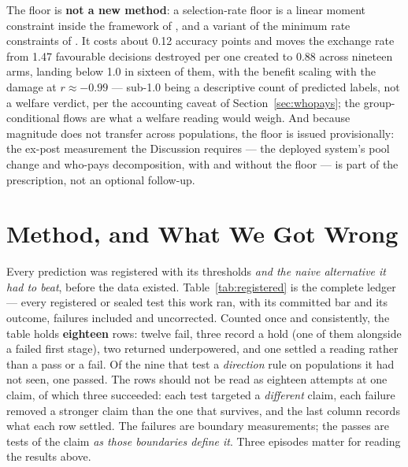 \documentclass[9pt,conference]{IEEEtran}
\begin{document}
The floor is \textbf{not a new method}: a selection-rate floor is a linear moment constraint
inside the framework of \cite{agarwal2018}, and a variant of the minimum rate constraints of
\cite{mittelstadt2023}. It costs about 0.12 accuracy points and moves the exchange rate from
1.47 favourable decisions destroyed per one created to 0.88 across nineteen arms, landing below
1.0 in sixteen of them, with the benefit scaling with the damage at $r \approx -0.99$ ---
sub-1.0 being a descriptive count of predicted labels, not a welfare verdict, per the
accounting caveat of Section~\ref{sec:whopays}; the group-conditional flows are what a
welfare reading would weigh. And because magnitude does not transfer across populations,
the floor is issued provisionally: the ex-post measurement the Discussion requires ---
the deployed system's pool change and who-pays decomposition, with and without the floor
--- is part of the prescription, not an optional follow-up.

\section{Method, and What We Got Wrong}
\label{sec:failures}

Every prediction was registered with its thresholds \emph{and the naive alternative it had to
beat}, before the data existed. Table~\ref{tab:registered} is the complete ledger --- every
registered or sealed test this work ran, with its committed bar and its outcome, failures
included and uncorrected. Counted once and consistently, the table holds \textbf{eighteen} rows: twelve fail, three
record a hold (one of them alongside a failed first stage), two returned underpowered, and one
settled a reading rather than a pass or a fail. Of the nine that test a \emph{direction} rule
on populations it had not seen, one passed. The rows should not be read as eighteen attempts
at one claim, of which three succeeded: each test targeted a \emph{different} claim, each failure removed a
stronger claim than the one that survives, and the last column records what each row
settled. The failures are boundary measurements; the passes are tests of the claim
\emph{as those boundaries define it}. Three episodes matter for reading the results above.
\end{document}
